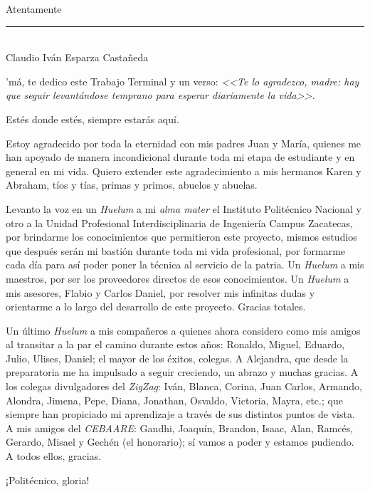 \documentclass[12pt, letterpaper, oneside]{book}
\begin{document}
	\begin{center}
		Atentamente
		\vspace*{1cm}\\
		\rule{7cm}{1pt}\\
		Claudio Iván Esparza Castañeda
	\end{center}
	\newpage
	\thispagestyle{empty}
	\epigraph{'má, te dedico este Trabajo Terminal y un verso: {\it<<Te lo agradezco, madre: hay que seguir levantándose temprano para esperar diariamente la vida>>.}}{Estés donde estés, siempre estarás aquí.}
	\newpage
	\thispagestyle{empty}
	Estoy agradecido por toda la eternidad con mis padres Juan y María, quienes me han apoyado de manera incondicional durante toda mi etapa de estudiante y en general en mi vida. Quiero extender este agradecimiento a mis hermanos Karen y Abraham, tíos y tías, primas y primos, abuelos y abuelas.
	\par Levanto la voz en un {\it Huelum} a mi {\it alma mater} el Instituto Politécnico Nacional y otro a la Unidad Profesional Interdisciplinaria de Ingeniería Campus Zacatecas, por brindarme los conocimientos que permitieron este proyecto, mismos estudios que después serán mi bastión durante toda mi vida profesional, por formarme cada día para así poder poner la técnica al servicio de la patria. Un {\it Huelum} a mis maestros, por ser los proveedores directos de esos conocimientos. Un {\it Huelum} a mis asesores, Flabio y Carlos Daniel, por resolver mis infinitas dudas y orientarme a lo largo del desarrollo de este proyecto. Gracias totales.
	\par Un último {\it Huelum} a mis compañeros a quienes ahora considero como mis amigos al transitar a la par el camino durante estos años: Ronaldo, Miguel, Eduardo, Julio, Ulises, Daniel; el mayor de los éxitos, colegas. A Alejandra, que desde la preparatoria me ha impulsado a seguir creciendo, un abrazo y muchas gracias. A los colegas divulgadores del {\it ZigZag}: Iván, Blanca, Corina, Juan Carlos, Armando, Alondra, Jimena, Pepe, Diana, Jonathan, Osvaldo, Victoria, Mayra, etc.; que siempre han propiciado mi aprendizaje a través de sus distintos puntos de vista. A mis amigos del {\it CEBAARE}: Gandhi, Joaquín, Brandon, Isaac, Alan, Ramcés, Gerardo, Misael y Gechén (el honorario); sí vamos a poder y estamos pudiendo. A todos ellos, gracias.
	\par ¡Politécnico, gloria!
\end{document}
